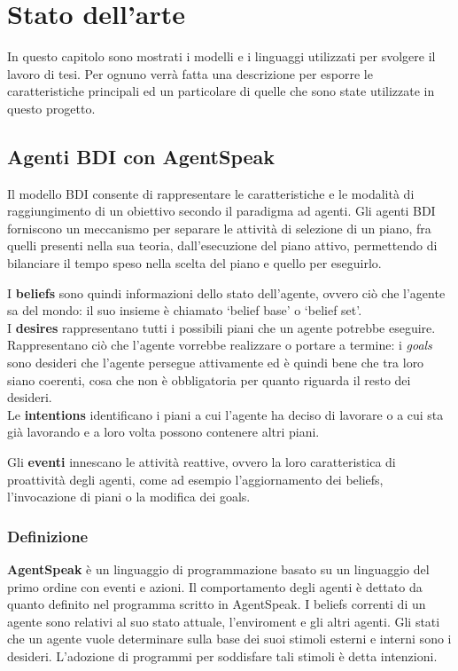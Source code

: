 \chapter{Stato dell'arte}
\lhead[\fancyplain{}{\bfseries\thepage}]{\fancyplain{}{\bfseries\rightmark}}

In questo capitolo sono mostrati i modelli e i linguaggi utilizzati per svolgere il lavoro di tesi. Per ognuno verr\`a fatta una descrizione per esporre le caratteristiche principali ed un particolare di quelle che sono state utilizzate in questo progetto.

\section{Agenti BDI con AgentSpeak}
Il modello BDI consente di rappresentare le caratteristiche e le modalit\`a di raggiungimento di un obiettivo secondo il paradigma ad agenti. Gli agenti BDI forniscono un meccanismo per separare le attivit\`a di selezione di un piano, fra quelli presenti nella sua teoria, dall'esecuzione del piano attivo, permettendo di bilanciare il tempo speso nella scelta del piano e quello per eseguirlo.

I \textbf{beliefs} sono quindi informazioni dello stato dell'agente, ovvero ci\`o che l'agente sa del mondo: il suo insieme \`e chiamato `belief base' o `belief set'.
\\
I \textbf{desires} rappresentano tutti i possibili piani che un agente potrebbe eseguire. Rappresentano ci\`o che l'agente vorrebbe realizzare o portare a termine: i \textit{goals} sono desideri che l'agente persegue attivamente ed \`e quindi bene che tra loro siano coerenti, cosa che non \`e obbligatoria per quanto riguarda il resto dei desideri.
\\
Le \textbf{intentions} identificano i piani a cui l'agente ha deciso di lavorare o a cui sta gi\`a lavorando e a loro volta possono contenere altri piani.

Gli \textbf{eventi} innescano le attivit\`a reattive, ovvero la loro caratteristica di proattivit\`a degli agenti, come ad esempio l'aggiornamento dei beliefs, l'invocazione di piani o la modifica dei goals.

\subsection{Definizione}
\textbf{AgentSpeak} \`e un linguaggio di programmazione basato su un linguaggio del primo ordine con eventi e azioni. Il comportamento degli agenti \`e dettato da quanto definito nel programma scritto in AgentSpeak. I beliefs correnti di un agente sono relativi al suo stato attuale, l'enviroment e gli altri agenti. Gli stati che un agente vuole determinare sulla base dei suoi stimoli esterni e interni sono i desideri. L'adozione di programmi per soddisfare tali stimoli \`e detta intenzioni.


